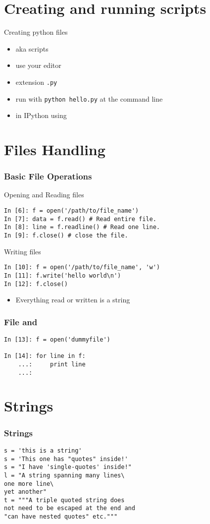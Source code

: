 \documentclass[14pt,compress]{beamer}
\newcounter{time}
\newcommand{\inctime}[1]{\addtocounter{time}{#1}{\tiny \thetime\ m}}
\newcommand{\typ}[1]{\texttt{#1}}
\newcommand{\kwrd}[1]{ \texttt{\textbf{\color{blue}{#1}}}  }
\begin{document}
\section{Creating and running scripts}
\begin{frame}
  {Creating python files}
  \begin{itemize}
    \item aka scripts
    \item use your editor
    \item extension \typ{.py}
    \item run with \texttt{python hello.py} at the command line
    \item in IPython using \kwrd{\%run}
  \end{itemize}
\inctime{5}
\end{frame}

\section{Files Handling}
\begin{frame}[fragile]
  \frametitle{Basic File Operations}
Opening and Reading files
\begin{lstlisting}
In [6]: f = open('/path/to/file_name')
In [7]: data = f.read() # Read entire file.
In [8]: line = f.readline() # Read one line.
In [9]: f.close() # close the file.
\end{lstlisting}
Writing files
\begin{lstlisting}
In [10]: f = open('/path/to/file_name', 'w')
In [11]: f.write('hello world\n')
In [12]: f.close()
\end{lstlisting}
\begin{itemize}
    \item Everything read or written is a string
\end{itemize}
\end{frame}

\begin{frame}[fragile]
    \frametitle{File and \kwrd{for}}
\begin{lstlisting}
In [13]: f = open('dummyfile')

In [14]: for line in f:
    ...:     print line
    ...:  
\end{lstlisting}
\inctime{10}
\end{frame}

\section{Strings}
\begin{frame}[fragile]
  \frametitle{Strings}
  \begin{lstlisting}
s = 'this is a string'
s = 'This one has "quotes" inside!'
s = "I have 'single-quotes' inside!"
l = "A string spanning many lines\
one more line\
yet another"
t = """A triple quoted string does
not need to be escaped at the end and 
"can have nested quotes" etc."""
  \end{lstlisting}
\end{frame}
\end{document}
